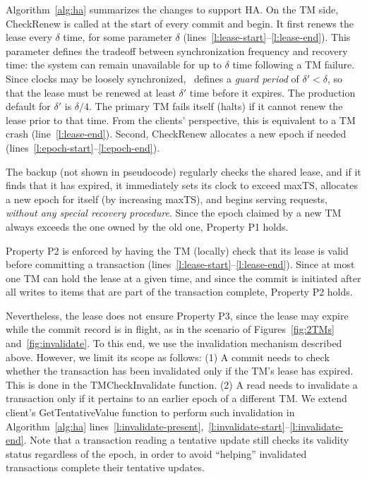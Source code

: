 Algorithm~\ref{alg:ha} summarizes the changes to support HA. On the TM side, 
{\sc CheckRenew} is called at the start of every commit and begin. 
It first  renews the lease every $\delta$ time, for some parameter $\delta$ (lines~\ref{l:lease-start}--\ref{l:lease-end}).
This parameter defines the tradeoff between synchronization frequency and recovery time:
the system can remain unavailable for up to $\delta$ time following a TM failure.
%
Since clocks may be loosely synchronized, \sys\ defines a {\em guard period\/} of $\delta' < \delta$, 
so that the lease must be renewed at least $\delta'$ time before it expires. 
The production default for $\delta'$ is $\delta/4$.
The primary TM fails itself (halts) if it cannot renew the lease prior to that time. 
From the clients' perspective, this is equivalent to a TM crash (line~\ref{l:lease-end}).
Second, {\sc CheckRenew} allocates a new epoch if needed (lines~\ref{l:epoch-start}--\ref{l:epoch-end}).

The backup (not shown in pseudocode) regularly checks the shared lease, and if it finds that it has expired, it immediately sets its clock to exceed maxTS,  
allocates a new epoch for itself (by increasing maxTS), and begins serving requests, \emph{without any special recovery procedure}.
Since the epoch claimed by a new TM always exceeds the one owned by the old one, Property P1 holds. 

Property P2 is enforced by having the TM (locally) check that its lease is valid before committing a transaction
(lines~\ref{l:lease-start}--\ref{l:lease-end}). 
Since at most one TM can hold the lease at a given time, and since the commit is initiated after all writes to items that are part of the transaction complete, Property P2  holds.

Nevertheless, the lease does not ensure Property P3, since the lease may expire while the commit record is in flight,
as in the scenario of Figures~\ref{fig:2TMs} and~\ref{fig:invalidate}. 
To this end, we use the invalidation mechanism described above. However, we limit its scope as follows: 
(1) A commit needs to check whether the transaction has been invalidated only if the TM's lease has expired.
This is done in the {\sc TMCheckInvalidate} function.
(2) A read needs to invalidate a transaction only if it pertains to an earlier epoch of a different TM. 
We extend client's {\sc GetTentativeValue} function to perform such invalidation 
in Algorithm~\ref{alg:ha} lines~\ref{l:invalidate-present},~\ref{l:invalidate-start}--\ref{l:invalidate-end}.
Note that a transaction reading a tentative update still checks its validity status regardless of the epoch, in order to avoid ``helping'' invalidated transactions complete their tentative updates. 





